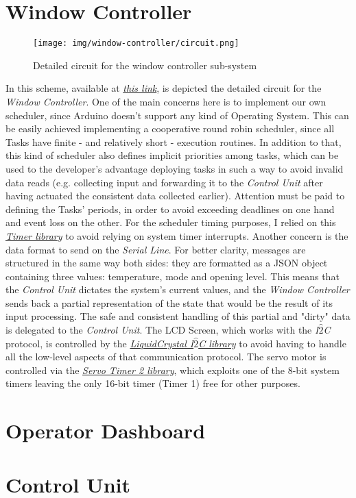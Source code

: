 \documentclass[a4paper,12pt]{report}
\begin{document}
	\section{Window Controller}
	\begin{figure}[H]
		\centering{}
		\texttt{[image: img/window-controller/circuit.png]}
		\caption{Detailed circuit for the window controller sub-system}
		\label{img:window-controller/circuit}
	\end{figure}
	In this scheme, available at \href{https://www.tinkercad.com/things/2nadVXk0wQ5-esiot-assignment-03-arduino?sharecode=t4LayAw_Rc1SNLqdSHt3uK_EuT6TttEPHQjHAwEp-Zc}{\textit{this link}}, is depicted the detailed circuit for the \textit{Window Controller}.
	\newline One of the main concerns here is to implement our own scheduler, since Arduino doesn't support any kind of Operating System. This can be easily achieved implementing a cooperative round robin scheduler, since all Tasks have finite - and relatively short - execution routines. In addition to that, this kind of scheduler also defines implicit priorities among tasks, which can be used to the developer's advantage deploying tasks in such a way to avoid invalid data reads (e.g. collecting input and forwarding it to the \textit{Control Unit} after having actuated the consistent data collected earlier). Attention must be paid to defining the Tasks' periods, in order to avoid exceeding deadlines on one hand and event loss on the other.
	\newline For the scheduler timing purposes, I relied on this \href{https://github.com/sstaub/Timer}{\textit{Timer library}} to avoid relying on system timer interrupts.
	\newline Another concern is the data format to send on the \textit{Serial Line}. For better clarity, messages are structured in the same way both sides: they are formatted as a JSON object containing three values: temperature, mode and opening level. This means that the \textit{Control Unit} dictates the system's current values, and the \textit{Window Controller} sends back a partial representation of the state that would be the result of its input processing. The safe and consistent handling of this partial and "dirty" data is delegated to the \textit{Control Unit}.
	\newline The LCD Screen, which works with the \textit{I$\hat{2}$C} protocol, is controlled by the \href{https://docs.arduino.cc/libraries/liquidcrystal-i2c/}{\textit{LiquidCrystal I$\hat{2}$C library}} to avoid having to handle all the low-level aspects of that communication protocol.
	\newline The servo motor is controlled via the \href{https://github.com/nabontra/ServoTimer2}{\textit{Servo Timer 2 library}}, which exploits one of the 8-bit system timers leaving the only 16-bit timer (Timer 1) free for other purposes.
	\section{Operator Dashboard}
	\section{Control Unit}
	
\end{document}
